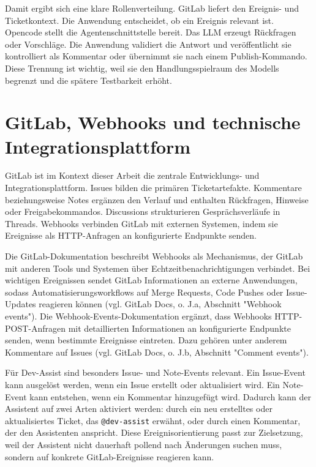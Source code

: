 \documentclass[12pt,a4paper,oneside]{scrreprt}
\begin{document}
Damit ergibt sich eine klare Rollenverteilung. GitLab liefert den Ereignis- und Ticketkontext. Die Anwendung entscheidet, ob ein Ereignis relevant ist. Opencode stellt die Agentenschnittstelle bereit. Das LLM erzeugt Rückfragen oder Vorschläge. Die Anwendung validiert die Antwort und veröffentlicht sie kontrolliert als Kommentar oder übernimmt sie nach einem Publish-Kommando. Diese Trennung ist wichtig, weil sie den Handlungsspielraum des Modells begrenzt und die spätere Testbarkeit erhöht.

\section{GitLab, Webhooks und technische Integrationsplattform}

GitLab ist im Kontext dieser Arbeit die zentrale Entwicklungs- und Integrationsplattform. Issues bilden die primären Ticketartefakte. Kommentare beziehungsweise Notes ergänzen den Verlauf und enthalten Rückfragen, Hinweise oder Freigabekommandos. Discussions strukturieren Gesprächsverläufe in Threads. Webhooks verbinden GitLab mit externen Systemen, indem sie Ereignisse als HTTP-Anfragen an konfigurierte Endpunkte senden.

Die GitLab-Dokumentation beschreibt Webhooks als Mechanismus, der GitLab mit anderen Tools und Systemen über Echtzeitbenachrichtigungen verbindet. Bei wichtigen Ereignissen sendet GitLab Informationen an externe Anwendungen, sodass Automatisierungsworkflows auf Merge Requests, Code Pushes oder Issue-Updates reagieren können (vgl. GitLab Docs, o. J.a, Abschnitt "Webhook events"). Die Webhook-Events-Dokumentation ergänzt, dass Webhooks HTTP-POST-Anfragen mit detaillierten Informationen an konfigurierte Endpunkte senden, wenn bestimmte Ereignisse eintreten. Dazu gehören unter anderem Kommentare auf Issues (vgl. GitLab Docs, o. J.b, Abschnitt "Comment events").

Für Dev-Assist sind besonders Issue- und Note-Events relevant. Ein Issue-Event kann ausgelöst werden, wenn ein Issue erstellt oder aktualisiert wird. Ein Note-Event kann entstehen, wenn ein Kommentar hinzugefügt wird. Dadurch kann der Assistent auf zwei Arten aktiviert werden: durch ein neu erstelltes oder aktualisiertes Ticket, das \texttt{@dev-assist} erwähnt, oder durch einen Kommentar, der den Assistenten anspricht. Diese Ereignisorientierung passt zur Zielsetzung, weil der Assistent nicht dauerhaft pollend nach Änderungen suchen muss, sondern auf konkrete GitLab-Ereignisse reagieren kann.
\end{document}
